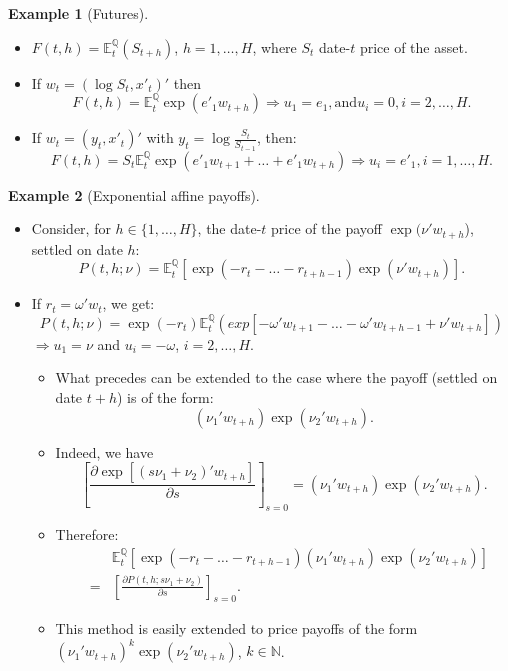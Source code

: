 \documentclass[
  12pt,
]{book}
\providecommand{\tightlist}{%
  \setlength{\itemsep}{0pt}\setlength{\parskip}{0pt}}
\theoremstyle{definition}
\theoremstyle{definition}
\newtheorem{example}{Example}[chapter]
\theoremstyle{definition}
\theoremstyle{definition}
\theoremstyle{remark}
\begin{document}
\begin{example}[Futures]
\protect\hypertarget{exm:Futures}{}\label{exm:Futures}\leavevmode

\begin{itemize}
\tightlist
\item
  \(F(t,h) = \mathbb{E}^{\mathbb{Q}}_t (S_{t+h})\), \(h=1,\dots,H\), where \(S_t\) date-\(t\) price of the asset.
\item
  If \(w_t = (\log S_t, x'_t)'\) then
  \[
  F(t,h) = \mathbb{E}^{\mathbb{Q}}_t \exp(e'_1 w_{t+h}) \Rightarrow u_1 = e_1,  \mbox{and}  u_i = 0,   i=2,\dots,H.
  \]
\item
  If \(w_t = (y_t, x'_t)'\) with \(y_t = \log \frac{S_t}{S_{t-1}}\), then:
  \[
  F(t,h) = S_t \mathbb{E}^{\mathbb{Q}}_t   \exp(e'_1 w_{t+1}+\dots+e'_1 w_{t+h}) \Rightarrow u_i = e'_1,  i=1,\dots,H.
  \]
\end{itemize}

\end{example}

\begin{example}[Exponential affine payoffs]
\protect\hypertarget{exm:ExponentialPayoff}{}\label{exm:ExponentialPayoff}\leavevmode

\begin{itemize}
\tightlist
\item
  Consider, for \(h \in \{1,\dots,H\}\), the date-\(t\) price of the payoff \(\exp(\nu' w_{t+h}\)), settled on date \(h\):
  \[
  P(t,h;\nu) = \mathbb{E}^{\mathbb{Q}}_t[\exp(-r_{t}-\dots-r_{t+h-1}) \exp(\nu' w_{t+h})].
  \]
\item
  If \(r_t = \omega'w_t\), we get:
  \[
  P(t,h;\nu) = \exp(-r_{t})\mathbb{E}^{\mathbb{Q}}_t \left(exp[-\omega' w_{t+1}-\dots-\omega' w_{t+h-1}+ \nu' w_{t+h}]\right)
  \]
  \(\Rightarrow u_1 = \nu\) and \(u_i = -\omega\), \(i = 2,\dots,H\).

  \begin{itemize}
  \tightlist
  \item
    What precedes can be extended to the case where the payoff (settled on date \(t+h\)) is of the form:
    \[
      (\nu_1'w_{t+h}) \exp(\nu_2' w_{t+h}).
      \]
  \item
    Indeed, we have
    \[
      \left[\frac{\partial \exp[(s \nu_1+ \nu_2)'w_{t+h}]}{\partial s}\right]_{s=0} = (\nu_1'w_{t+h}) \exp(\nu_2' w_{t+h}).
      \]
  \item
    Therefore:
    \begin{eqnarray}
      &&\mathbb{E}_t^{\mathbb{Q}}[\exp(-r_t - \dots - r_{t+h-1})(\nu_1'w_{t+h}) \exp(\nu_2' w_{t+h})] \nonumber\\
      &=& \left[
      \frac{\partial P(t,h;s \nu_1 + \nu_2)}{\partial s}
      \right]_{s=0}.\label{eq:Affineexppayoff}
      \end{eqnarray}
  \item
    This method is easily extended to price payoffs of the form \((\nu_1'w_{t+h})^k \exp(\nu_2' w_{t+h})\), \(k \in \mathbb{N}\).
  \end{itemize}
\end{itemize}

\end{example}
\end{document}
